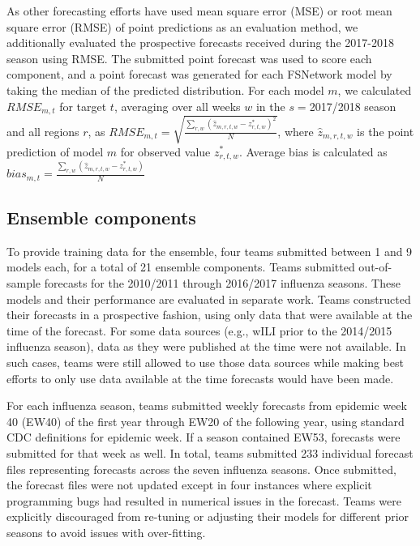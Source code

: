 \documentclass{article}\usepackage[]{graphicx}\usepackage[]{color}
\begin{document}
As other forecasting efforts have used mean square error (MSE) or root mean square error (RMSE) of point predictions as an evaluation method, we additionally evaluated the prospective forecasts received during the 2017-2018 season using RMSE. The submitted point forecast was used to score each component, and a point forecast was generated for each FSNetwork model by taking the median of the predicted distribution. For each model $m$, we calculated $RMSE_{m,t}$ for target $t$, averaging over all weeks $w$ in the $s=$2017/2018 season and all regions $r$, as $RMSE_{m,t} = \sqrt{\frac{\sum_{r,w}(\hat z_{m,r,t,w} - z^*_{r,t,w})^2}{N}}$, where $\hat z_{m,r,t,w}$ is the point prediction of model $m$ for observed value $z^*_{r,t,w}$. Average bias is calculated as $bias_{m,t} = \frac{\sum_{r,w}(\hat z_{m,r,t,w} - z^*_{r,t,w})}{N}$

\subsection{Ensemble components}
To provide training data for the ensemble, four teams submitted between 1 and 9 models each, for a total of 21 ensemble components. Teams submitted out-of-sample forecasts for the 2010/2011 through 2016/2017 influenza seasons. These models and their performance are evaluated in separate work.\cite{Reich2018} Teams constructed their forecasts in a prospective fashion, using only data that were available at the time of the forecast. For some data sources (e.g., wILI prior to the 2014/2015 influenza season), data as they were published at the time were not available. In such cases, teams were still allowed to use those data sources while making best efforts to only use data available at the time forecasts would have been made.

For each influenza season, teams submitted weekly forecasts from epidemic week 40 (EW40) of the first year through EW20 of the following year, using standard CDC definitions for epidemic week.\cite{NewMexicoDepartmentofHealth,Niemi2015,Tushar2018} If a season contained EW53, forecasts were submitted for that week as well. In total, teams submitted 233 individual forecast files representing forecasts across the seven influenza seasons. Once submitted, the forecast files were not updated except in four instances where explicit programming bugs had resulted in numerical issues in the forecast. Teams were explicitly discouraged from re-tuning or adjusting their models for different prior seasons to avoid issues with over-fitting.
\end{document}
